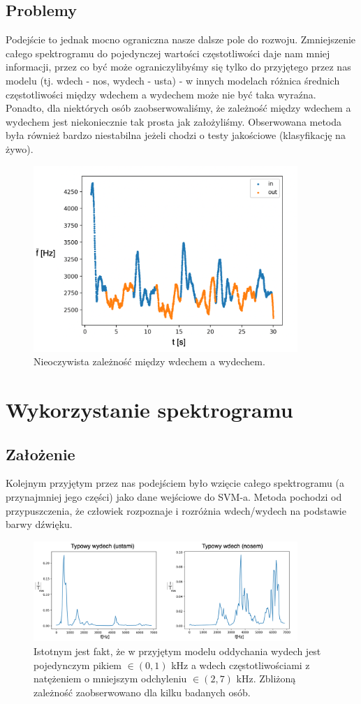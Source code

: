 \documentclass[polish]{article}
\begin{document}
\subsection{Problemy}
Podejście to jednak mocno ograniczna nasze dalsze pole do rozwoju.  Zmniejszenie całego 
spektrogramu do pojedynczej wartości częstotliwości daje nam mniej informacji, przez co 
być może ograniczylibyśmy się tylko do przyjętego przez nas modelu (tj.  wdech - nos, wydech - usta) - w innych
modelach różnica średnich częstotliwości między wdechem a wydechem może nie być taka wyraźna.  Ponadto, dla niektórych osób zaobserwowaliśmy, 
że zależność między wdechem a wydechem jest niekoniecznie tak prosta jak założyliśmy. Obserwowana metoda
była również bardzo niestabilna jeżeli chodzi o testy jakościowe (klasyfikację na żywo).
\begin{figure}[H]
	\centering
	\includegraphics[width=10cm]{problem_srednie_ozn}
	\caption{Nieoczywista zależność między wdechem a wydechem.}
\end{figure}

\section{Wykorzystanie spektrogramu}
\subsection{Założenie}
Kolejnym przyjętym przez nas podejściem było wzięcie całego spektrogramu (a przynajmniej jego części) jako dane wejściowe do SVM-a.  
Metoda pochodzi od przypuszczenia, że człowiek rozpoznaje i rozróżnia wdech/wydech
na podstawie barwy dźwięku.  
\begin{figure}[H]
	\centering
	\includegraphics[width=10cm]{wdech_wydech_spektro}
  	\caption{Istotnym jest fakt, że w przyjętym modelu oddychania wydech
jest pojedynczym pikiem $\in (0, 1)$ kHz a wdech częstotliwościami z natężeniem
o mniejszym odchyleniu $\in (2, 7)$ kHz.  Zbliżoną zależność zaobserwowano dla kilku badanych osób.}
\end{figure}
\end{document}
